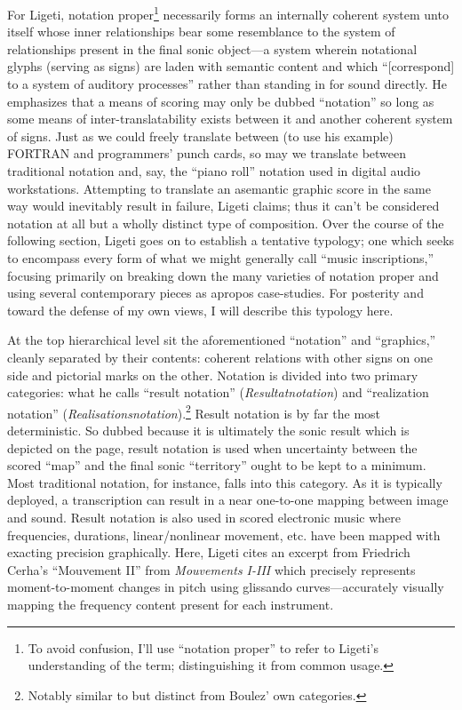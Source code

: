     For Ligeti, notation proper\footnote{To avoid confusion, I'll use ``notation proper'' to refer to Ligeti's understanding of the term; distinguishing it from common usage.} necessarily forms an internally coherent system unto itself whose inner relationships bear some resemblance to the system of relationships present in the final sonic object---a system wherein notational glyphs (serving as signs) are laden with semantic content and which ``[correspond] to a system of auditory processes'' rather than standing in for sound directly.\autocite[pg. 171 in Ernst et al., 1965.]{Ligeti_forthcoming} He emphasizes that a means of scoring may only be dubbed ``notation'' so long as some means of inter-translatability exists between it and another coherent system of signs. Just as we could freely translate between (to use his example) FORTRAN and programmers' punch cards, so may we translate between traditional notation and, say, the ``piano roll'' notation used in digital audio workstations. Attempting to translate an asemantic graphic score in the same way would inevitably result in failure, Ligeti claims; thus it can't be considered notation at all but a wholly distinct type of composition. Over the course of the following section, Ligeti goes on to establish a tentative typology; one which seeks to encompass every form of what we might generally call ``music inscriptions,'' focusing primarily on breaking down the many varieties of notation proper and using several contemporary pieces as apropos case-studies. For posterity and toward the defense of my own views, I will describe this typology here.

    At the top hierarchical level sit the aforementioned ``notation'' and ``graphics,'' cleanly separated by their contents: coherent relations with other signs on one side and pictorial marks on the other. Notation is divided into  two primary categories: what he calls ``result notation'' (\textit{Resultatnotation}) and ``realization notation'' (\textit{Realisationsnotation}).\footnote{Notably similar to but distinct from Boulez' own categories.} Result notation is by far the most deterministic. So dubbed because it is ultimately the sonic result which is depicted on the page, result notation is used when uncertainty between the scored ``map'' and the final sonic ``territory'' ought to be kept to a minimum. Most traditional notation, for instance, falls into this category. As it is typically deployed, a transcription can result in a near one-to-one mapping between image and sound. Result notation is also used in scored electronic music where frequencies, durations, linear/nonlinear movement, etc. have been mapped with exacting precision graphically. Here, Ligeti cites an excerpt from Friedrich Cerha's ``Mouvement II'' from \textit{Mouvements I-III} which precisely represents moment-to-moment changes in pitch using glissando curves---accurately visually mapping the frequency content present for each instrument.

